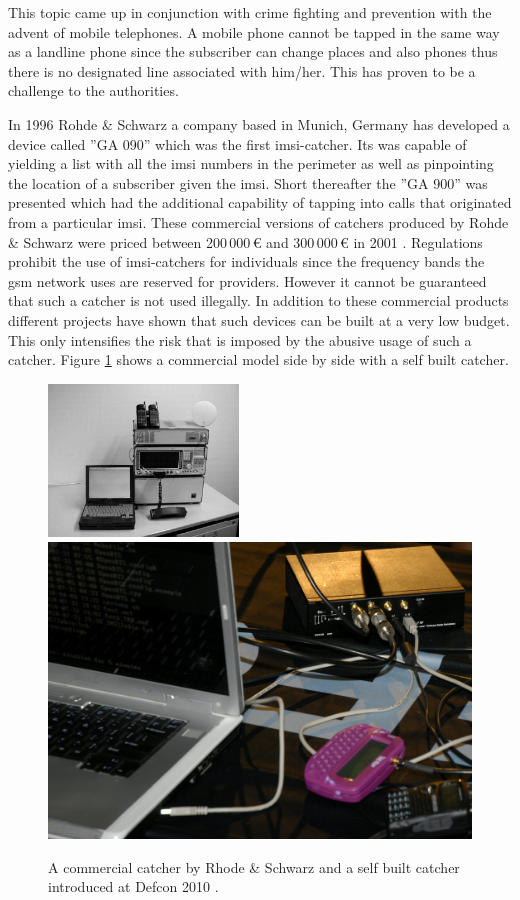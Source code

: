 This topic came up in conjunction with crime fighting and prevention with the advent of mobile telephones.
A mobile phone cannot be tapped in the same way as a landline phone since the subscriber can change places and also phones thus there is no designated line associated with him/her.
This has proven to be a challenge to the authorities.

In 1996 Rohde \& Schwarz a company based in Munich, Germany has developed a device called ''GA 090'' which was the first \gls{imsi}-catcher.
Its was capable of yielding a list with all the \gls{imsi} numbers in the perimeter as well as pinpointing the location of a subscriber given the \gls{imsi}.
Short thereafter the ''GA 900'' was presented which had the additional capability of tapping into calls that originated from a particular \gls{imsi}.
These commercial versions of catchers produced by Rohde \& Schwarz were priced between 200\,000\,\euro{} and 300\,000\,\euro{} in 2001 \cite{fox}.
Regulations prohibit the use of \gls{imsi}-catchers for individuals since the frequency bands the \gls{gsm} network uses are reserved for providers.
However it cannot be guaranteed that such a catcher is not used illegally.
In addition to these commercial products different projects \cite{dennis, def_catcher} have shown that such devices can be built at a very low budget.
This only intensifies the risk that is imposed by the abusive usage of such a catcher.
Figure \ref{fig:catchers} shows a commercial model side by side with a self built catcher.
\begin{figure}
\centering
\includegraphics[width=0.45\textwidth]{../Images/imsi_catcher}\hspace{1cm}\includegraphics[width=.45\textwidth]{../Images/usrp}
\caption{A commercial catcher by Rhode \& Schwarz \cite{fox} and a self built catcher introduced at Defcon 2010 \cite{def_catcher}.}
\label{fig:catchers}
\end{figure}

